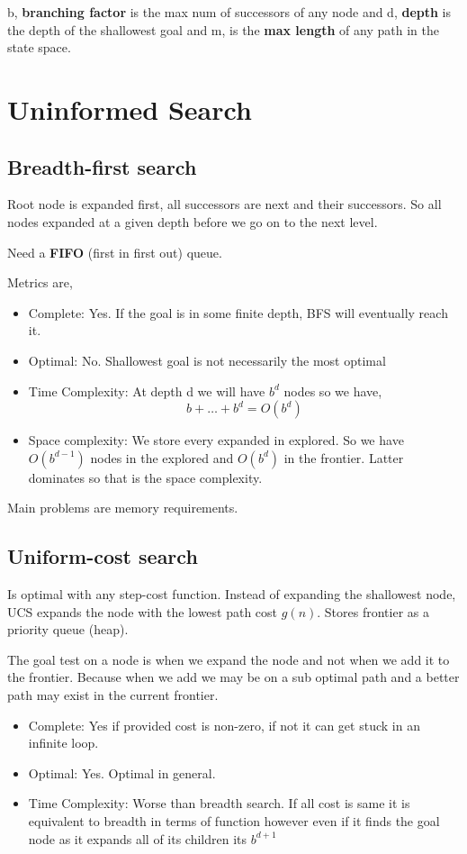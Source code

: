 b, \textbf{branching factor}  is the max num of successors of any node and d, \textbf{depth}  is the depth of the shallowest goal and m, is the \textbf{max length} of any path in the state space.

\section{Uninformed Search}
\subsection{Breadth-first search}
Root node is expanded first, all successors are next and their successors. So all nodes expanded at a given depth before we go on to the next level.

Need a \textbf{FIFO }(first in first out) queue.

Metrics are, 
\begin{itemize}
    \item Complete: Yes. If the goal is in some finite depth, BFS will eventually reach it.
    \item Optimal: No. Shallowest goal is not necessarily the most optimal
    \item Time Complexity: At depth d we will have $b^{d}$ nodes so we have,
        $$ b + \dots + b^{d} = O(b^{d}) $$ 
    \item Space complexity: We store every expanded in explored. So we have $O(b^{d - 1})$ nodes in the explored and $O(b^{d})$ in the frontier. Latter dominates so that is the space complexity.
\end{itemize}


Main problems are memory requirements. 


\subsection*{Uniform-cost search}
Is optimal with any step-cost function. Instead of expanding the shallowest node, UCS expands the node with the lowest path cost $g(n)$. Stores frontier as a priority queue (heap).

The goal test on a node is when we expand the node and not when we add it to the frontier. Because when we add we may be on a sub optimal path and a better path may exist in the current frontier.
\begin{itemize}
    \item Complete: Yes if provided cost is non-zero, if not it can get stuck in an infinite loop.
    \item Optimal: Yes. Optimal in general.
    \item Time Complexity: Worse than breadth search. If all cost is same it is equivalent to breadth in terms of function however even if it finds the goal node as it expands all of its children its $b^{d + 1}$
\end{itemize}

